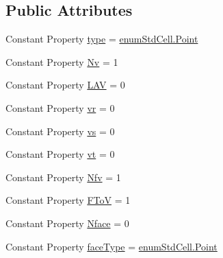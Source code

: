 \subsection*{Public Attributes}
\begin{DoxyCompactItemize}
\item 
Constant Property \hyperlink{class_std_point_a72baba995f0fc1df0e09f0f1e4950caa}{type} = \hyperlink{classenum_std_cell_ac4c2fa4e189e76e103f3ff9b1d19b9e7a055fa6159d5be915a3c9df01d16d5bb7}{enum\+Std\+Cell.\+Point}
\item 
Constant Property \hyperlink{class_std_point_a0296c72e154ec959cdefd53e4bf931e1}{Nv} = 1
\item 
Constant Property \hyperlink{class_std_point_a925d2bd1d831ea5b938c2530c36e838a}{L\+AV} = 0
\item 
Constant Property \hyperlink{class_std_point_a82ae21042d299b3771099cd1e40d2359}{vr} = 0
\item 
Constant Property \hyperlink{class_std_point_a168706233ea575638c5a7027ef32d562}{vs} = 0
\item 
Constant Property \hyperlink{class_std_point_a1198b8d9346ab1e35a10e24ef803931a}{vt} = 0
\item 
Constant Property \hyperlink{class_std_point_af3df768bc60c601f00018d327728595b}{Nfv} = 1
\item 
Constant Property \hyperlink{class_std_point_a96f3d942d8fe0a39738048abebed8469}{F\+ToV} = 1
\item 
Constant Property \hyperlink{class_std_point_a2109cf8febaef4fc53790e9f4c2c33ad}{Nface} = 0
\item 
Constant Property \hyperlink{class_std_point_ae45f645567f7fdcd6c053a3be2c38ad6}{face\+Type} = \hyperlink{classenum_std_cell_ac4c2fa4e189e76e103f3ff9b1d19b9e7a055fa6159d5be915a3c9df01d16d5bb7}{enum\+Std\+Cell.\+Point}
\end{DoxyCompactItemize}
